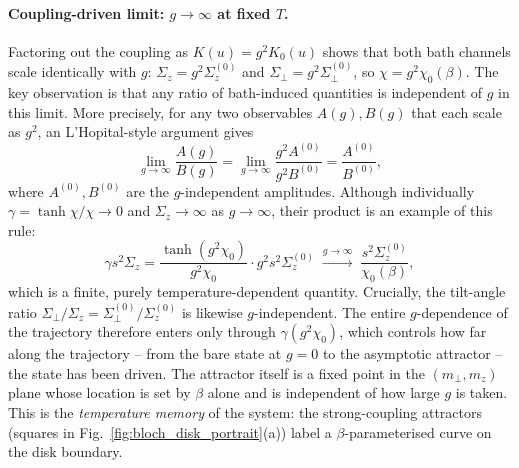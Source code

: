 \paragraph{Coupling-driven limit: $g\to\infty$ at fixed $T$.}
Factoring out the coupling as $K(u)=g^2 K_0(u)$ shows that both bath channels
scale identically with $g$: $\Sigma_z = g^2\Sigma_z^{(0)}$ and
$\Sigma_\perp = g^2\Sigma_\perp^{(0)}$, so $\chi = g^2\chi_0(\beta)$.  
The key observation is that any ratio of bath-induced quantities is independent of $g$ in this limit.
More precisely, for any two observables $A(g), B(g)$ that each scale as $g^2$, an L'Hopital-style argument gives
\begin{equation}
  \lim_{g\to\infty} \frac{A(g)}{B(g)} = \lim_{g\to\infty} \frac{g^2 A^{(0)}}{g^2 B^{(0)}} = \frac{A^{(0)}}{B^{(0)}},
  \label{eq:ginfty_ratio}
\end{equation}
where $A^{(0)}, B^{(0)}$ are the $g$-independent amplitudes. Although individually
$\gamma=\tanh\chi/\chi\to 0$ and $\Sigma_z\to\infty$ as $g\to\infty$, their product is an example of this rule:
\begin{equation}
  \gamma s^2\Sigma_z = \frac{\tanh(g^2\chi_0)}{g^2\chi_0}\cdot g^2 s^2\Sigma_z^{(0)}
  \;\xrightarrow{g\to\infty}\; \frac{s^2\Sigma_z^{(0)}}{\chi_0(\beta)},
  \label{eq:ginfty_dressing}
\end{equation}
which is a finite, purely temperature-dependent quantity. Crucially, the tilt-angle ratio
$\Sigma_\perp/\Sigma_z = \Sigma_\perp^{(0)}/\Sigma_z^{(0)}$ is likewise $g$-independent.
The entire $g$-dependence of the trajectory therefore enters only through $\gamma(g^2\chi_0)$,
which controls how far along the trajectory --  from the bare state at $g=0$ to the
asymptotic attractor -- the state has been driven.  The attractor itself is a fixed
point in the $(m_\perp, m_z)$ plane whose location is set by $\beta$ alone and is
independent of how large $g$ is taken.  This is the \emph{temperature memory} of the
system: the strong-coupling attractors (squares in Fig.~\ref{fig:bloch_disk_portrait}(a))
label a $\beta$-parameterised curve on the disk boundary.

